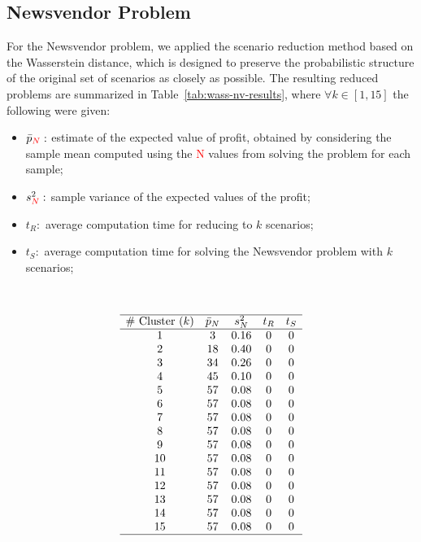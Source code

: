 \documentclass[a4paper,12pt]{article}
\begin{document}
	\subsection{Newsvendor Problem}
	
	For the Newsvendor problem, we applied the scenario reduction method based on the Wasserstein distance, which is designed to preserve the probabilistic structure of the original set of scenarios as closely as possible. The resulting reduced problems are summarized in Table~\ref{tab:wass-nv-results}, where $\forall k \in [1,15]$ the following were given:
	\begin{itemize}
		\item $\bar{p}_{\textcolor{red}{N}}:$ estimate of the expected value of profit, obtained by considering the sample mean computed using the \textcolor{red}{N} values from solving the problem for each sample; 
		\item $s^{2}_{\textcolor{red}{N}}:$ sample variance of the expected values of the profit;
		\item $t_{R}:$ average computation time for reducing to $k$ scenarios;
		\item $t_{S}:$ average computation time for solving the Newsvendor problem with $k$ scenarios;
	\end{itemize}~
	
	\[
	\begin{array}{ccccc}
		\hline
		\text{\# Cluster $(k)$} & \text{$\bar{p}_{N}$} & \text{$s_{N}^{2}$} & \text{$t_{R}$} & \text{$t_{S}$}\\
		\hline
		1 & 3 & 0.16 & 0 & 0\\
		2 & 18 & 0.40 & 0 & 0\\
		3 & 34 & 0.26 & 0 & 0\\
		4 & 45 & 0.10 & 0 & 0\\
		5 & 57 & 0.08 & 0 & 0\\
		6 & 57 & 0.08 & 0 & 0\\
		7 & 57 & 0.08 & 0 & 0\\
		8 & 57 & 0.08 & 0 & 0\\
		9 & 57 & 0.08 & 0 & 0\\
		10 & 57 & 0.08 & 0 & 0\\
		11 & 57 & 0.08 & 0 & 0\\
		12 & 57& 0.08 & 0 & 0\\
		13 & 57 & 0.08 & 0 & 0\\
		14 & 57 & 0.08 & 0 & 0\\
		15 & 57 & 0.08 & 0 & 0\\
		\hline
	\end{array}
	\]
	
\end{document}
